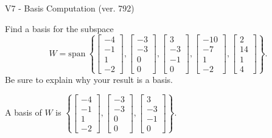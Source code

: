 \begin{exercise}
  \begin{exerciseTitle}V7 - Basis Computation (ver. 792)\end{exerciseTitle}
  \begin{exerciseStatement}
    Find a basis for the subspace 
\[W=\mathrm{span}\ \left\{\left[\begin{array}{r}
-4 \\
-1 \\
1 \\
-2
\end{array}\right] , \left[\begin{array}{r}
-3 \\
-3 \\
0 \\
0
\end{array}\right] , \left[\begin{array}{r}
3 \\
-3 \\
-1 \\
0
\end{array}\right] , \left[\begin{array}{r}
-10 \\
-7 \\
1 \\
-2
\end{array}\right] , \left[\begin{array}{r}
2 \\
14 \\
1 \\
4
\end{array}\right]\right\}.\]
 Be sure to explain why your result is a basis.


  \end{exerciseStatement}
  \begin{exerciseAnswer}
   A basis of \(W\) is  \(\left\{\left[\begin{array}{r}
-4 \\
-1 \\
1 \\
-2
\end{array}\right] , \left[\begin{array}{r}
-3 \\
-3 \\
0 \\
0
\end{array}\right] , \left[\begin{array}{r}
3 \\
-3 \\
-1 \\
0
\end{array}\right]\right\}\).
  


  \end{exerciseAnswer}
\end{exercise}